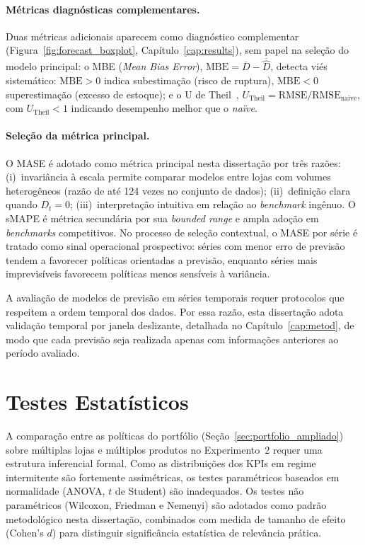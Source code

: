 \paragraph{Métricas diagnósticas complementares.} Duas métricas adicionais aparecem como diagnóstico complementar (Figura~\ref{fig:forecast_boxplot}, Capítulo~\ref{cap:results}), sem papel na seleção do modelo principal: o MBE (\textit{Mean Bias Error}), $\text{MBE} = \overline{D} - \overline{\hat{D}}$, detecta viés sistemático: $\text{MBE}>0$ indica subestimação (risco de ruptura), $\text{MBE}<0$ superestimação (excesso de estoque); e o U de Theil~\citep{Theil1966AppliedEconometrics}, $U_{\text{Theil}} = \text{RMSE}/\text{RMSE}_{\text{naïve}}$, com $U_{\text{Theil}}<1$ indicando desempenho melhor que o \textit{naïve}.

\paragraph{Seleção da métrica principal.}
O MASE é adotado como métrica principal nesta dissertação por três razões: (i)~invariância à escala permite comparar modelos entre lojas com volumes heterogêneos (razão de até 124 vezes no conjunto de dados); (ii)~definição clara quando $D_t = 0$; (iii)~interpretação intuitiva em relação ao \textit{benchmark} ingênuo. O sMAPE é métrica secundária por sua \textit{bounded range} e ampla adoção em \textit{benchmarks} competitivos. No processo de seleção contextual, o MASE por série é tratado como sinal operacional prospectivo: séries com menor erro de previsão tendem a favorecer políticas orientadas a previsão, enquanto séries mais imprevisíveis favorecem políticas menos sensíveis à variância.

A avaliação de modelos de previsão em séries temporais requer protocolos que respeitem a ordem temporal dos dados. Por essa razão, esta dissertação adota validação temporal por janela deslizante, detalhada no Capítulo~\ref{cap:metod}, de modo que cada previsão seja realizada apenas com informações anteriores ao período avaliado.

\section{Testes Estatísticos}
\label{sec:stat_tests}

A comparação entre as políticas do portfólio (Seção~\ref{sec:portfolio_ampliado}) sobre múltiplas lojas e múltiplos produtos no Experimento~2 requer uma estrutura inferencial formal. Como as distribuições dos KPIs em regime intermitente são fortemente assimétricas, os testes paramétricos baseados em normalidade (ANOVA, $t$ de Student) são inadequados. Os testes não paramétricos (Wilcoxon, Friedman e Nemenyi) são adotados como padrão metodológico nesta dissertação, combinados com medida de tamanho de efeito (Cohen's $d$) para distinguir significância estatística de relevância prática.

